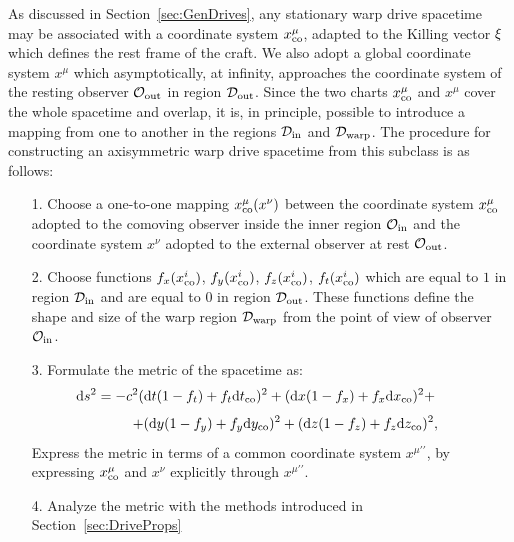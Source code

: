 \documentclass[10pt]{iopart}
\begin{document}
As discussed in Section~\ref{sec:GenDrives}, any stationary warp drive spacetime may be associated with a coordinate system $x^\mu_{\rm co}$, adapted to the Killing vector ${\bf \xi}$ which defines the rest frame of the craft. We also adopt a global coordinate system $x^\mu$ which asymptotically, at infinity, approaches the coordinate system of the resting observer $\mathcal{O}_{\rm out}$ in region $\mathcal{D}_{\rm out}$. Since the two charts $x^\mu_{\rm co}$ and $x^\mu$ cover the whole spacetime and overlap, it is, in principle, possible to introduce a mapping from one to another in the regions $\mathcal{D}_{\rm in}$ and $\mathcal{D}_{\rm warp}$. The procedure for constructing an axisymmetric warp drive spacetime from this subclass is as follows:
\begin{enumerate}
    \item[1.] Choose a one-to-one mapping $x^{\mu}_{\rm co}(x^{\nu})$ between the coordinate system $x^{\mu}_{\rm co}$ adopted to the comoving observer inside the inner region $\mathcal{O}_{\rm in}$ and the coordinate system $x^{\nu}$ adopted to the external observer at rest $\mathcal{O}_{\rm out}$.
    \item[2.] Choose functions  $f_x (x^i_{\rm co})$, $f_y (x^i_{\rm co})$, $f_z (x^i_{\rm co})$, $f_t (x^i_{\rm co})$ which are equal to $1$ in region $\mathcal{D}_{\rm in}$ and are equal to $0$ in region $\mathcal{D}_{\rm out}$. These functions define the shape and size of the warp region $\mathcal{D}_{\rm warp}$ from the point of view of observer $\mathcal{O}_{\rm in}$.
    \item[3.] Formulate the metric of the spacetime as:
    \begin{equation}
    \label{eq:GenTrans}
    {\rm d}s^2=-c^2  ({\rm d}t(1-f_t)+f_t{\rm d} t_{\rm co})^2 + ({\rm d}x(1-f_x)+f_x {\rm d} x_{\rm co})^2+\qquad\
    \end{equation}
\[
 \qquad + ({\rm d}y(1-f_y)+f_y{\rm d} y_{\rm co})^2 + ({\rm d}z(1-f_z)+f_z{\rm d} z_{\rm co})^2,
\]
Express the metric in terms of { a common coordinate system $x^{\mu \prime\prime}$, by expressing $x^\mu_{\rm co}$ and $x^\nu$ explicitly through $x^{\mu \prime\prime}$}.
    \item[4.] Analyze the metric with the methods introduced in Section~\ref{sec:DriveProps}
\end{enumerate}
\end{document}
